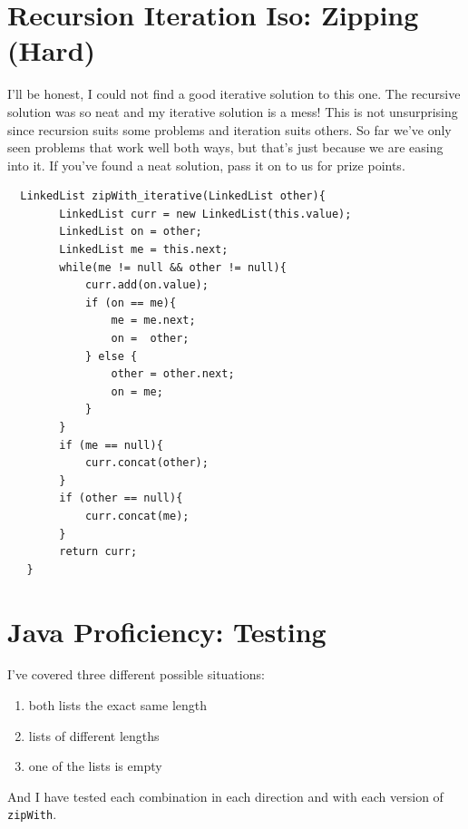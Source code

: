 \documentclass[twoside=false,DIV=14]{scrartcl}
\begin{document}
  \section{Recursion Iteration Iso: Zipping (Hard)}
  I'll be honest, I could not find a good iterative solution to this one.  The recursive solution was so neat and my iterative solution is a mess!  This is not unsurprising since recursion suits some problems and iteration suits others.  So far we've only seen problems that work well both ways, but that's just because we are easing into it.  If you've found a neat solution, pass it on to us for prize points.
  \begin{lstlisting}
  LinkedList zipWith_iterative(LinkedList other){
        LinkedList curr = new LinkedList(this.value);
        LinkedList on = other;
        LinkedList me = this.next;
        while(me != null && other != null){
            curr.add(on.value);
            if (on == me){
                me = me.next;
                on =  other;
            } else {
                other = other.next;
                on = me;
            }
        }
        if (me == null){
            curr.concat(other);
        }
        if (other == null){
            curr.concat(me);
        }
        return curr;
   }

  \end{lstlisting}
  \section{Java Proficiency: Testing}
  I've covered three different possible situations:
  \begin{enumerate}
  \item both lists the exact same length
  \item lists of different lengths
  \item one of the lists is empty
  \end{enumerate}
  And I have tested each combination in each direction and with each version of \lstinline|zipWith|.
\end{document}
